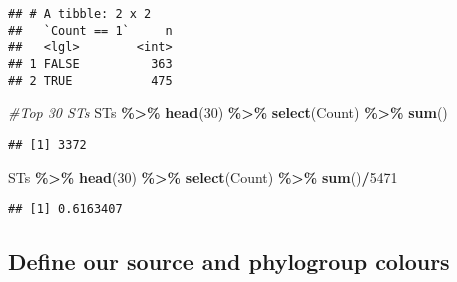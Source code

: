 \documentclass[
]{article}
\newenvironment{Shaded}{\begin{snugshade}}{\end{snugshade}}
\newcommand{\CommentTok}[1]{\textcolor[rgb]{0.56,0.35,0.01}{\textit{#1}}}
\newcommand{\DecValTok}[1]{\textcolor[rgb]{0.00,0.00,0.81}{#1}}
\newcommand{\FunctionTok}[1]{\textcolor[rgb]{0.13,0.29,0.53}{\textbf{#1}}}
\newcommand{\NormalTok}[1]{#1}
\newcommand{\SpecialCharTok}[1]{\textcolor[rgb]{0.81,0.36,0.00}{\textbf{#1}}}
\begin{document}
\begin{verbatim}
## # A tibble: 2 x 2
##   `Count == 1`     n
##   <lgl>        <int>
## 1 FALSE          363
## 2 TRUE           475
\end{verbatim}

\begin{Shaded}
\begin{Highlighting}[]
\CommentTok{\#Top 30 STs}
\NormalTok{STs }\SpecialCharTok{\%\textgreater{}\%} \FunctionTok{head}\NormalTok{(}\DecValTok{30}\NormalTok{) }\SpecialCharTok{\%\textgreater{}\%} \FunctionTok{select}\NormalTok{(Count) }\SpecialCharTok{\%\textgreater{}\%} \FunctionTok{sum}\NormalTok{()}
\end{Highlighting}
\end{Shaded}

\begin{verbatim}
## [1] 3372
\end{verbatim}

\begin{Shaded}
\begin{Highlighting}[]
\NormalTok{STs }\SpecialCharTok{\%\textgreater{}\%} \FunctionTok{head}\NormalTok{(}\DecValTok{30}\NormalTok{) }\SpecialCharTok{\%\textgreater{}\%} \FunctionTok{select}\NormalTok{(Count) }\SpecialCharTok{\%\textgreater{}\%} \FunctionTok{sum}\NormalTok{()}\SpecialCharTok{/}\DecValTok{5471}
\end{Highlighting}
\end{Shaded}

\begin{verbatim}
## [1] 0.6163407
\end{verbatim}

\hypertarget{define-our-source-and-phylogroup-colours}{%
\subsection{Define our source and phylogroup
colours}\label{define-our-source-and-phylogroup-colours}}
\end{document}
